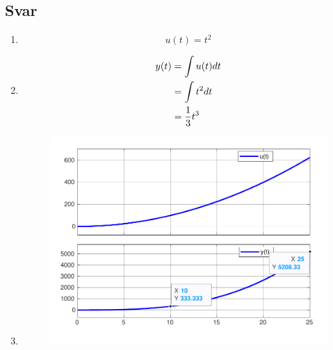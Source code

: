 \documentclass[answers,11pt]{exam}
\begin{document}
\begin{enumerate}[label=\alph*)]
\begin{tcolorbox}
  \end{tcolorbox}

  \newpage
  

  \begin{tcolorbox}
    \subsection*{Svar}

    \begin{enumerate}[label=c\arabic*)]
      \item
            \[u(t) = t^2\]

      \item
            \begin{align}
              y(t) & = \int u(t)dt \notag \\
                   & =\int t^2dt \notag   \\
                   & = \frac{1}{3}t^3
            \end{align}
      \item

            \parbox{\textwidth}{
              \begin{figure}[H]
                \centering
                \hspace*{0mm}\scalebox{0.60}
                {\includegraphics{figurer/c3.pdf}}
                \label{fig:2c}
              \end{figure}
            }


\end{enumerate}
\end{tcolorbox}
\end{enumerate}
\end{document}
